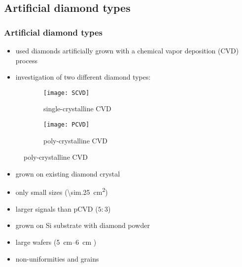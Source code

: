 \subsection{Artificial diamond types}
\begin{frame}
	\frametitle{Artificial diamond types}
	\begin{itemize}
		\item used diamonds artificially grown with a chemical vapor deposition (CVD) process
		\item investigation of two different diamond types:
	\end{itemize}
	\begin{figure}[htbp] 
		\begin{center}
			\begin{subfigure}{0.45\textwidth}  
				\centering 
				\texttt{[image: SCVD]}
				\caption{single-crystalline CVD}
			\end{subfigure}
			\begin{subfigure}{0.45\textwidth} 
				\centering 
				\texttt{[image: PCVD]}
				\caption{poly-crystalline CVD} 	
			\end{subfigure} 
		\end{center}
	\end{figure}
	\begin{minipage}{5.5cm}
		\begin{itemize}
			\item grown on existing diamond crystal
			\item only small sizes (\SI{\sim.25}{cm^2})
			\item larger signals than pCVD ($5:3$)
		\end{itemize}
	\end{minipage}
	\hspace*{2pt}
	\begin{minipage}{5.5cm}
		\begin{itemize}
			\item grown on Si substrate with diamond powder
			\item large wafers (\SIrange{5}{6}{cm} \diameter)
			\item non-uniformities and grains
		\end{itemize}
	\end{minipage}
\end{frame}

